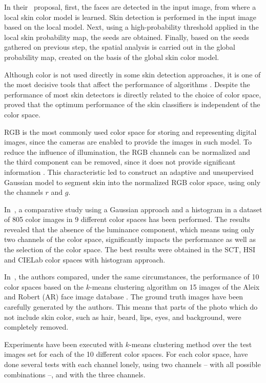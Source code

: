 In their~\citep{kawulok:13} proposal, first, the faces are detected in the input image, from where a local skin color model is learned. Skin detection is performed in the input image based on the local model. Next, using a high-probability threshold applied in the local skin probability map, the seeds are obtained. Finally, based on the seeds gathered on previous step, the spatial analysis is carried out in the global probability map, created on the basis of the global skin color model.

Although color is not used directly in some skin detection approaches, it is one of the most decisive tools that affect the performance of algorithms \citep{mahmoodi:16}. Despite the performance of most skin detectors is directly related to the choice of color space, \citet{albiol:01} proved that the optimum performance of the skin classifiers is independent of the color space.

RGB is the most commonly used color space for storing and representing digital images, since the cameras are enabled to provide the images in such model. To reduce the influence of illumination, the RGB channels can be normalized and the third component can be removed, since it does not provide significant information \citep{kakumanu:07}. This characteristic led \citet{bergasa:00} to construct an adaptive and unsupervised Gaussian model to segment skin into the normalized RGB color space, using only the channels $r$ and $g$.

In~\citet{jayaram:04}, a comparative study using a Gaussian approach and a histogram in a dataset of 805 color images in 9 different color spaces has been performed. The results revealed that the absence of the luminance component, which means using only two channels of the color space, significantly impacts the performance as well as the selection of the color space. The best results were obtained in the SCT, HSI and CIELab color spaces with histogram approach.

In~\citet{chaves:10}, the authors compared, under the same circumstances, the performance of 10 color spaces based on the $k$-means clustering algorithm on 15 images of the Aleix and Robert (AR) face image database \citep{ar-face-database:98}. The ground truth images have been carefully generated by the authors. This means that parts of the photo which do not include skin color, such as hair, beard, lips, eyes, and background, were completely removed.

Experiments have been executed with $k$-means clustering method over the test images set for each of the 10 different color spaces. For each color space, \citet{chaves:10} have done several tests with each channel lonely, using two channels -- with all possible combinations --, and with the three channels.

